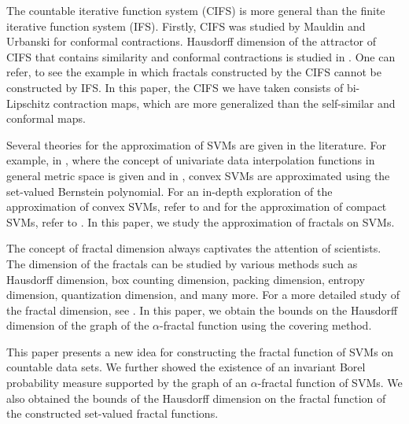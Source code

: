 \documentclass[12pt,oneside,reqno]{amsart}
\theoremstyle{definition}
\theoremstyle{remark}
\begin{document}
The countable iterative function system (CIFS) is more general than the finite iterative function system (IFS). Firstly, CIFS was studied by Mauldin and Urbanski \cite{Mauldin96} for conformal contractions. Hausdorff dimension of the attractor of CIFS that contains similarity and conformal contractions is studied in \cite{Mauldin96, Hille, Jiang}. One can refer, \cite{Mauldin96, Secelean } to see the example in which fractals constructed by the CIFS cannot be constructed by IFS.
In this paper, the CIFS we have taken consists of bi-Lipschitz contraction maps, which are more generalized than the self-similar and conformal maps.  

Several theories for the approximation of SVMs are given in the literature. For example, in \cite{levin}, where the concept of univariate data interpolation functions in general metric space is given and in \cite{Vitale}, convex SVMs are approximated using the set-valued Bernstein polynomial. For an in-depth exploration of the approximation of convex SVMs, refer to \cite{Rbaier, Mcampiti, Ndyn1} and for the approximation of compact SVMs, refer to \cite{Berdysheva, Ndyn}. In this paper, we study the approximation of fractals on SVMs.

The concept of fractal dimension always captivates the attention of scientists. The dimension of the fractals can be studied by various methods such as Hausdorff dimension, box counting dimension, packing dimension, entropy dimension, quantization dimension, and many more. For a more detailed study of the fractal dimension, see \cite{AchourBilel, Mauldin88, Chandra22, Liang10, PostOper12, AV2, DV1, GCV2, BilelLiang, Yu}. In this paper, we obtain the bounds on the Hausdorff dimension of the graph of the $\alpha$-fractal function using the covering method.

This paper presents a new idea for constructing the fractal function of SVMs on countable data sets. We further showed the existence of an invariant Borel probability measure supported by the graph of an $\alpha$-fractal function of SVMs. We also obtained the bounds of the Hausdorff dimension on the fractal function of the constructed set-valued fractal functions.




 

 
\end{document}
